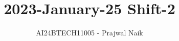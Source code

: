 \documentclass[journal]{IEEEtran}
\begin{document}

\vspace{3cm}

\title{2023-January-25 Shift-2}
\author{AI24BTECH11005 - Prajwal Naik}
{\let\newpage\relax\maketitle}

\renewcommand{\thefigure}{\theenumi}
\renewcommand{\thetable}{\theenumi}
\setlength{\intextsep}{10pt} %


\renewcommand{\thetable}{\theenumi}
\end{document}
